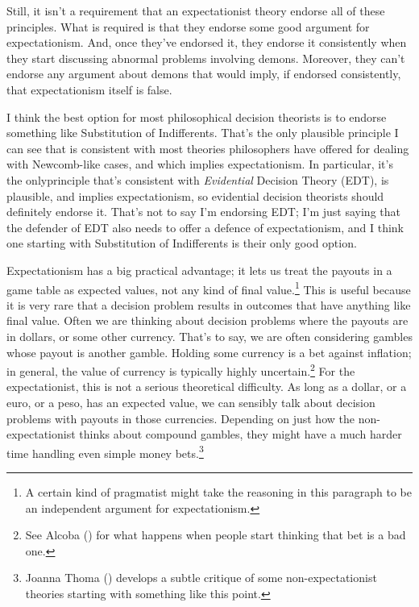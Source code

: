 \documentclass[
  12pt,
  letterpaper,
  DIV=11,
  numbers=noendperiod]{scrreprt}
\begin{document}
Still, it isn't a requirement that an expectationist theory endorse all
of these principles. What is required is that they endorse some good
argument for expectationism. And, once they've endorsed it, they endorse
it consistently when they start discussing abnormal problems involving
demons. Moreover, they can't endorse any argument about demons that
would imply, if endorsed consistently, that expectationism itself is
false.

I think the best option for most philosophical decision theorists is to
endorse something like Substitution of Indifferents. That's the only
plausible principle I can see that is consistent with most theories
philosophers have offered for dealing with Newcomb-like cases, and which
implies expectationism. In particular, it's the onlyprinciple that's
consistent with \emph{Evidential} Decision Theory (EDT), is plausible,
and implies expectationism, so evidential decision theorists should
definitely endorse it. That's not to say I'm endorsing EDT; I'm just
saying that the defender of EDT also needs to offer a defence of
expectationism, and I think one starting with Substitution of
Indifferents is their only good option.

Expectationism has a big practical advantage; it lets us treat the
payouts in a game table as expected values, not any kind of final
value.\footnote{A certain kind of pragmatist might take the reasoning in
  this paragraph to be an independent argument for expectationism.} This
is useful because it is very rare that a decision problem results in
outcomes that have anything like final value. Often we are thinking
about decision problems where the payouts are in dollars, or some other
currency. That's to say, we are often considering gambles whose payout
is another gamble. Holding some currency is a bet against inflation; in
general, the value of currency is typically highly uncertain.\footnote{See
  Alcoba () for what happens when people
  start thinking that bet is a bad one.} For the expectationist, this is
not a serious theoretical difficulty. As long as a dollar, or a euro, or
a peso, has an expected value, we can sensibly talk about decision
problems with payouts in those currencies. Depending on just how the
non-expectationist thinks about compound gambles, they might have a much
harder time handling even simple money bets.\footnote{Joanna Thoma
  () develops a subtle critique of some
  non-expectationist theories starting with something like this point.}
\end{document}
